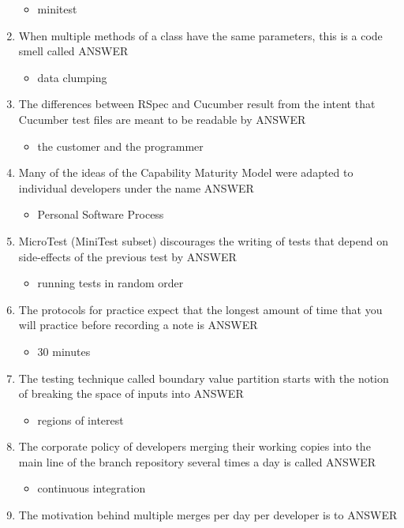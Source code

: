 \documentclass{exam}
\begin{document}
\begin{enumerate}
\begin{itemize}
\item minitest
\end{itemize}
\item When multiple methods of a class have the same parameters, this is a code smell called ANSWER
\begin{itemize}
\item data clumping
\end{itemize}
\item The differences between RSpec and Cucumber result from the intent that Cucumber test files are meant to be readable by ANSWER
\begin{itemize}
\item the customer and the programmer
\end{itemize}
\item Many of the ideas of the Capability Maturity Model were adapted to individual developers under the name ANSWER
\begin{itemize}
\item Personal Software Process
\end{itemize}
\item MicroTest (MiniTest subset) discourages the writing of tests that depend on side-effects of the previous test by ANSWER
\begin{itemize}
\item running tests in random order
\end{itemize}
\item The protocols for practice expect that the longest amount of time that you will practice before recording a note is ANSWER
\begin{itemize}
\item 30 minutes
\end{itemize}
\item The testing technique called boundary value partition starts with the notion of breaking the space of inputs into ANSWER
\begin{itemize}
\item regions of interest
\end{itemize}
\item The corporate policy of developers merging their working copies into the main line of the branch repository several times a day is called ANSWER
\begin{itemize}
\item continuous integration
\end{itemize}
\item The motivation behind multiple merges per day per developer is to ANSWER

\end{enumerate}
\end{document}
